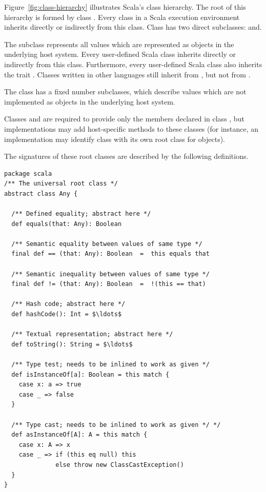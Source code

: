 {Figure~\ref{fig:class-hierarchy} illustrates Scala's class
hierarchy.
The root of this hierarchy is formed by class .
Every class in a Scala execution environment inherits directly or
indirectly from this class.  Class  has two direct
subclasses:  and.

The subclass  represents all values which are represented
as objects in the underlying host system. Every user-defined Scala
class inherits directly or indirectly from this class. Furthermore,
every user-defined Scala class also inherits the trait
.  Classes written in other languages still
inherit from , but not from
.

The class  has a fixed number subclasses, which describe
values which are not implemented as objects in the underlying host
system.

Classes  and  are required to provide only
the members declared in class , but implementations may add
host-specific methods to these classes (for instance, an
implementation may identify class  with its own root
class for objects).

The signatures of these root classes are described by the following
definitions.

\begin{lstlisting}
package scala 
/** The universal root class */
abstract class Any {

  /** Defined equality; abstract here */
  def equals(that: Any): Boolean 

  /** Semantic equality between values of same type */
  final def == (that: Any): Boolean  =  this equals that

  /** Semantic inequality between values of same type */
  final def != (that: Any): Boolean  =  !(this == that)

  /** Hash code; abstract here */
  def hashCode(): Int = $\ldots$

  /** Textual representation; abstract here */
  def toString(): String = $\ldots$

  /** Type test; needs to be inlined to work as given */
  def isInstanceOf[a]: Boolean = this match {
    case x: a => true
    case _ => false
  }

  /** Type cast; needs to be inlined to work as given */ */
  def asInstanceOf[A]: A = this match {
    case x: A => x
    case _ => if (this eq null) this
              else throw new ClassCastException()
  }
}


\end{lstlisting}}
